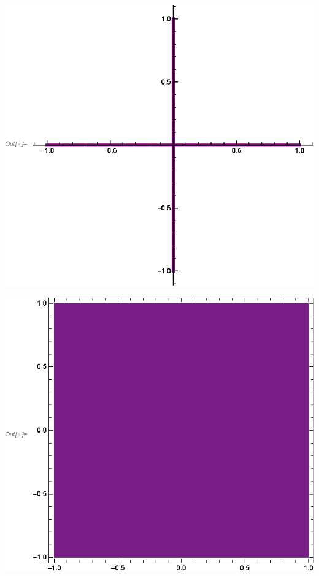 \documentclass{article}
\begin{document}
\includegraphics{u+w_gr3.eps}

\includegraphics{u+w_gr4.eps}
\end{document}
